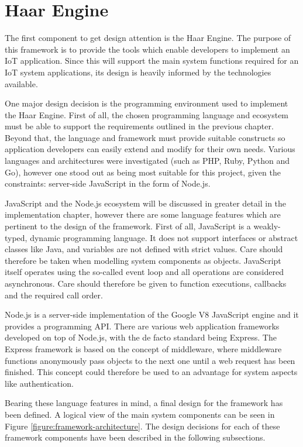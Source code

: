   \section{Haar Engine}
    The first component to get design attention is the Haar Engine. The purpose of this framework is to provide the tools which enable developers to implement an IoT application. Since this will support the main system functions required for an IoT system applications, its design is heavily informed by the technologies available.

    One major design decision is the programming environment used to implement the Haar Engine. First of all, the chosen programming language and ecosystem must be able to support the requirements outlined in the previous chapter. Beyond that, the language and framework must provide suitable constructs so application developers can easily extend and modify for their own needs. Various languages and architectures were investigated (such as PHP, Ruby, Python and Go), however one stood out as being most suitable for this project, given the constraints: server-side JavaScript in the form of Node.js.

    JavaScript and the Node.js ecosystem will be discussed in greater detail in the implementation chapter, however there are some language features which are pertinent to the design of the framework. First of all, JavaScript is a weakly-typed, dynamic programming language. It does not support interfaces or abstract classes like Java, and variables are not defined with strict values. Care should therefore be taken when modelling system components as objects. JavaScript itself operates using the so-called event loop and all operations are considered asynchronous. Care should therefore be given to function executions, callbacks and the required call order.

    Node.js is a server-side implementation of the Google V8 JavaScript engine and it provides a programming API. There are various web application frameworks developed on top of Node.js, with the de facto standard being Express. The Express framework is based on the concept of middleware, where middleware functions anonymously pass objects to the next one until a web request has been finished. This concept could therefore be used to an advantage for system aspects like authentication.

    Bearing these language features in mind, a final design for the framework has been defined. A logical view of the main system components can be seen in Figure \ref{figure:framework-architecture}. The design decisions for each of these framework components have been described in the following subsections.


